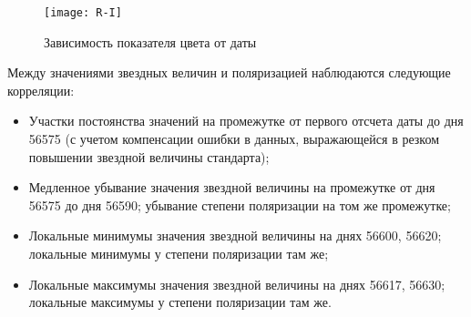 \newpage

\begin{figure}[h]
  \centering
  \texttt{[image: R-I]}
  \caption{Зависимость показателя цвета от даты}
\end{figure}

Между значениями звездных величин и поляризацией наблюдаются следующие корреляции:

\begin{itemize}
  \setlength\itemsep{-0.1em}
  \item Участки постоянства значений на промежутке от первого отсчета даты до дня 56575 (с учетом компенсации ошибки в данных, выражающейся в резком повышении звездной величины стандарта);
  \item Медленное убывание значения звездной величины на промежутке от дня 56575 до дня 56590; убывание степени поляризации на том же промежутке;
  \item Локальные минимумы значения звездной величины на днях 56600, 56620; локальные минимумы у степени поляризации там же;
  \item Локальные максимумы значения звездной величины на днях 56617, 56630; локальные максимумы у степени поляризации там же.
\end{itemize}

